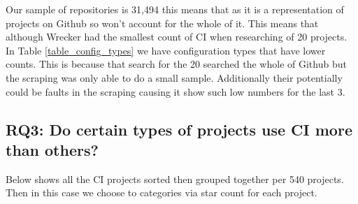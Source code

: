 \documentclass[twoside,12pt,titlepage,a4paper]{article}
\begin{document}
Our sample of repositories is 31,494 this means that as it is a representation of projects on Github so won't account for the whole of it. This means that although Wrecker had the smallest count of CI when researching of 20 projects. In Table \ref{table_config_types} we have configuration types that have lower counts. This is because that search for the 20 searched the whole of Github but the scraping was only able to do a small sample. Additionally their potentially could be faults in the scraping causing it show such low numbers for the last 3. 

\vspace*{-0.05in}
\subsection{\textbf{RQ3}: Do certain types of projects use CI more than others?}  
\label{section:RQ3}
\vspace*{-0.05in}

Below shows all the CI projects sorted then grouped together per 540 projects. Then in this case we choose to categories via star count for each project. 
\end{document}
